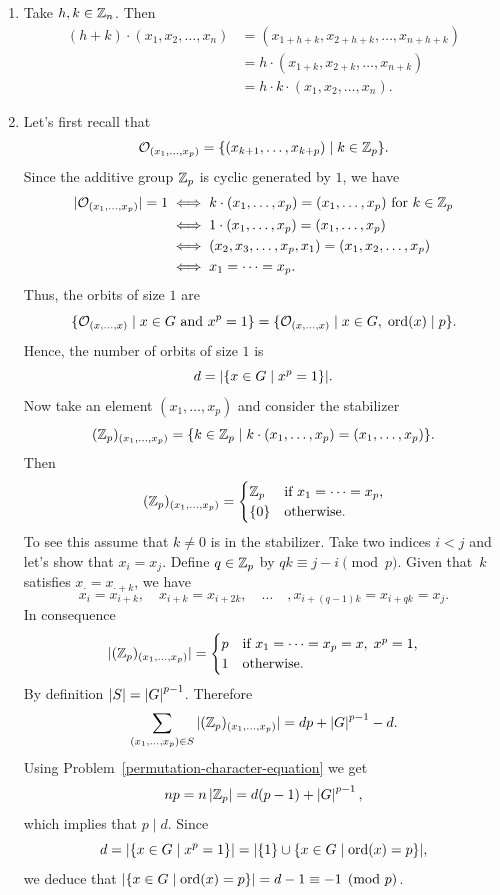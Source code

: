 \begin{solution}
\begin{enumerate}[\upshape a)]
    \item Take $h,k\in\mathbb{Z}_n$. Then
    \begin{align*}
        (h+k)\cdot(x_1, x_2, \dots, x_n) &= (x_{1+h+k}, x_{2+h+k}, \dots, x_{n+h+k})\\
            &=h\cdot(x_{1+k}, x_{2+k}, \dots, x_{n+k})\\
            &=h\cdot k\cdot(x_1, x_2, \dots, x_n).
    \end{align*}

    \item Let's first recall that
    $$
        {\cal O}_{(x_1,\dots,x_p)} = \{(x_{k+1},\dots,x_{k+p})\mid k\in\mathbb{Z}_p\}.
    $$
    Since the additive group $\mathbb{Z}_p$ is cyclic generated by $1$, we have
    \begin{align*}
        |{\cal O}_{(x_1,\dots,x_p)}| = 1&\iff k\cdot(x_1,\dots,x_p) = (x_1,\dots,x_p)
                \textrm{ for }k\in\mathbb{Z}_p\\
            &\iff 1\cdot(x_1,\dots,x_p) = (x_1,\dots,x_p)\\
            &\iff(x_2, x_3,\dots,x_p,x_1) = (x_1,x_2,\dots,x_p)\\
            &\iff x_1=\cdots=x_p.
    \end{align*}
    Thus, the orbits of size $1$ are
    $$
        \{{\cal O}_{(x,\dots,x)}\mid x\in G\textrm{ and }x^p=1\}
        = \{{\cal O}_{(x,\dots,x)}\mid x\in G,\;{\rm ord}(x)\mid p\}.
    $$
    Hence, the number of orbits of size $1$ is
    $$
        d = |\{x\in G\mid x^p=1\}|.
    $$
    Now take an element $(x_1,\dots,x_p)$ and consider the stabilizer
    $$
        (\mathbb{Z}_p)_{(x_1,\dots,x_p)} = \{k\in\mathbb{Z}_p\mid k\cdot(x_1,\dots,x_p)=(x_1,\dots,x_p)\}.
    $$
    Then
    $$
        (\mathbb{Z}_p)_{(x_1,\dots,x_p)}=\begin{cases}
            \mathbb{Z}_p&\text{if } x_1=\cdots=x_p,\\
            \{0\}&\text{otherwise}.
        \end{cases} 
    $$
    To see this assume that $k\ne0$ is in the stabilizer. Take two indices $i<j$ and let's show that $x_i=x_j$. Define $q\in\mathbb{Z}_p$ by $qk\equiv j-i\pmod p$. Given that~$k$ satisfies $x_\cdot= x_{\cdot+k}$, we have
    $$
        x_i=x_{i+k},\quad x_{i+k}=x_{i+2k},\quad\dots\quad,x_{i+(q-1)k}=x_{i+qk}=x_j.
    $$
    In consequence
    $$
        |(\mathbb{Z}_p)_{(x_1,\dots,x_p)}|=\begin{cases}
            p&\text{if } x_1=\cdots=x_p=x,\; x^p=1,\\
            1&\text{otherwise}.
        \end{cases} 
    $$
    By definition $|S|=\left\vert{G}\right\vert^{p-1}$. Therefore
    $$
        \sum_{(x_1,\dots,x_p)\in S}|(\mathbb{Z}_p)_{(x_1,\dots,x_p)}| = dp + \left\vert{G}\right\vert^{p-1}-d.
    $$
    Using Problem~\ref{permutation-character-equation} we get
    $$
        np=n\left\vert{\mathbb{Z}_p}\right\vert=d(p-1) + \left\vert{G}\right\vert^{p-1},
    $$
    which implies that $p\mid d$. Since
    $$
        d = |\{x\in G\mid x^p=1\}| = |\{1\}\cup\{x\in G\mid {\rm ord}(x)=p\}|,
    $$
    we deduce that $|\{x\in G\mid {\rm ord}(x)=p\}|=d-1\equiv-1\pmod p$.
    

\end{enumerate}
\end{solution}
